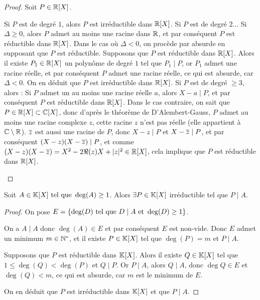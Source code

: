 \documentclass[12pt,a4paper]{report}
\begin{document}
\begin{proof}
    Soit $P \in \mathbb{R}[X]$.
    \begin{outline}
        \1 Si $P$ est de degré $1$, alors $P$ est irréductible dans $\mathbb{R}[X]$.
        \1 Si $P$ est de degré $2$...
        \2 Si $\Delta \ge 0$, alors $P$ admet au moins une racine dans $\mathbb{R}$, et par conséquent $P$ est réductible dans $\mathbb{R}[X]$.
        \2 Dans le cas où $\Delta < 0$, on procède par absurde en supposant que $P$ est réductible.
        \3 Supposons que $P$ est réductible dans $\mathbb{R}[X]$. Alors il existe $P_1 \in \mathbb{R}[X]$ un polynôme de degré $1$ tel que $P_1 \mid P$, or $P_1$ admet une racine réelle, et par conséquent $P$ admet une racine réelle, ce qui est absurde, car $\Delta < 0$.
        \3 On en déduit que $P$ est irréductible dans $\mathbb{R}[X]$.
        \1 Si $P$ est de degré $\ge 3$, alors :
        \2 Si $P$ admet un au moins une racine réelle $a$, alors $X-a \mid P$, et par conséquent $P$ est réductible dans $\mathbb{R}[X]$.
        \2 Dans le cas contraire, on sait que $P \in \mathbb{R}[X] \subset \mathbb{C}[X]$, donc d'après le théorème de D'Alembert-Gauss, $P$ admet au moins une racine complexe $z$, cette racine $z$ n'est pas réelle (elle appartient à $\mathbb{C}\setminus\mathbb{R}$). $\overline{z}$ est aussi une racine de $P$, donc $X-z \mid P$ et $X-\overline{z} \mid P$, et par conséquent $(X-z)(X-\overline{z}) \mid P$, et comme $(X-z)(X-\overline{z}) = X^2 - 2\Re(z)X + |z|^2 \in \mathbb{R}[X]$, cela implique que $P$ est réductible dans $\mathbb{R}[X]$.
    \end{outline}
\end{proof}

\begin{property}
    Soit $A \in \mathbb{K}[X] \text{ tel que } \deg(A) \ge 1$. Alors $\exists P \in \mathbb{K}[X]$ irréductible tel que $P \mid A$.
\end{property}

\begin{proof}
    On pose $E = \{\deg(D) \text{ tel que } D\mid A \text{ et } \deg(D) \ge 1\}$.

    On a $A \mid A$ donc $\deg(A) \in E$ et par conséquent $E$ est non-vide. Donc $E$ admet un minimum $m \in \mathbb{N}^*$, et il existe $P \in \mathbb{K}[X]$ tel que $\deg(P) = m$ et $P \mid A$.

    Supposons que $P$ est réductible dans $\mathbb{K}[X]$. Alors il existe $Q \in \mathbb{K}[X]$ tel que $1 \le \deg(Q) < \deg(P)$ et $Q \mid P$. Or $P \mid A$, alors $Q \mid A$, donc $\deg Q \in E$ et $\deg(Q) < m$, ce qui est absurde, car $m$ est le minimum de $E$.

    On en déduit que $P$ est irréductible dans $\mathbb{K}[X]$ et que $P \mid A$.
\end{proof}
\end{document}
